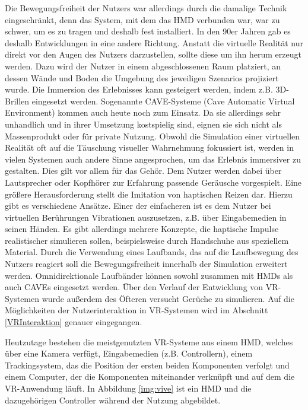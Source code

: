 Die Bewegungsfreiheit der Nutzers war allerdings durch die damalige Technik eingeschränkt, denn das System, mit dem das HMD verbunden war, war zu schwer, um es zu tragen und deshalb fest installiert. 
In den 90er Jahren gab es deshalb Entwicklungen in eine andere Richtung. Anstatt die virtuelle Realität nur direkt vor den Augen des Nutzers darzustellen, sollte diese um ihn herum erzeugt werden. Dazu wird der Nutzer in einem abgeschlossenen Raum platziert, an dessen Wände und Boden die Umgebung des jeweiligen Szenarios projiziert wurde. Die Immersion des Erlebnisses kann gesteigert werden, indem z.B. 3D-Brillen eingesetzt werden. Sogenannte CAVE-Systeme (Cave Automatic Virtual Environment) kommen auch heute noch zum Einsatz. Da sie allerdings sehr unhandlich und in ihrer Umsetzung kostspielig sind, eignen sie sich nicht als Massenprodukt oder für private Nutzung.
Obwohl die Simulation einer virtuellen Realität oft auf die Täuschung visueller Wahrnehmung fokussiert ist, werden in vielen Systemen auch andere Sinne angesprochen, um das Erlebnis immersiver zu gestalten. Dies gilt vor allem für das Gehör. Dem Nutzer werden dabei über Lautsprecher oder Kopfhörer zur Erfahrung passende Geräusche vorgespielt.
Eine größere Herausforderung stellt die Imitation von haptischen Reizen dar. Hierzu gibt es verschiedene Ansätze. Einer der einfacheren ist es dem Nutzer bei virtuellen Berührungen Vibrationen auszusetzen, z.B. über Eingabemedien in seinen Händen. Es gibt allerdings mehrere Konzepte, die haptische Impulse realistischer simulieren sollen, beispielsweise durch Handschuhe aus speziellem Material. %
Durch die Verwendung eines Laufbands, das auf die Laufbewegung des Nutzers reagiert soll die Bewegungsfreiheit innerhalb der Simulation erweitert werden. Omnidirektionale Laufbänder können sowohl zusammen mit HMDs als auch CAVEs eingesetzt werden.
Über den Verlauf der Entwicklung von VR-Systemen wurde außerdem des Öfteren versucht Gerüche zu simulieren.  
Auf die Möglichkeiten der Nutzerinteraktion in VR-Systemen wird im Abschnitt \ref{VRInteraktion} genauer eingegangen.

Heutzutage bestehen die meistgenutzten VR-Systeme aus einem HMD, welches über eine Kamera verfügt, Eingabemedien (z.B. Controllern), einem Trackingsystem, das die Position der ersten beiden Komponenten verfolgt und einem Computer, der die Komponenten miteinander verknüpft und auf dem die VR-Anwendung läuft. 
In Abbildung \ref{img:vive} ist ein HMD und die dazugehörigen Controller während der Nutzung abgebildet.

